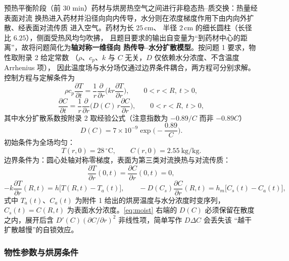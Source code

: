 \documentclass{ctexart}
\begin{document}
预热平衡阶段（前 30 min）药材与烘房热空气之间进行非稳态热--质交换：热量经表面对流
换热进入药材并沿径向向内传导，水分则在浓度梯度作用下由内向外扩散、经表面对流传质
进入空气\cite{yan2026heat,srikiatden2007moisture}。药材为长 $25\,\mathrm{cm}$、
半径 $2\,\mathrm{cm}$ 的细长圆柱（长径比 $6.25$），侧面受热风均匀吹拂，
且题目要求的输出自变量为“到药材中心的距离”，故将问题简化为\textbf{轴对称一维径向
热传导--水分扩散模型}。按问题 1 要求，物性取附录 2 给定常数
（$\rho$、$c_p$、$k$ 与 $C$ 无关，$D$ 仅依赖水分浓度、不含温度 Arrhenius 项），
因此温度场与水分场仅通过边界条件耦合，两方程可分别求解。控制方程与定解条件为
\begin{equation}
  \rho c_p\frac{\partial T}{\partial t}
  =\frac{1}{r}\frac{\partial}{\partial r}\Big(k r\frac{\partial T}{\partial r}\Big),
  \qquad 0<r<R,\ t>0,
  \label{eq:heat}
\end{equation}
\begin{equation}
  \frac{\partial C}{\partial t}
  =\frac{1}{r}\frac{\partial}{\partial r}\Big(D(C)\,r\frac{\partial C}{\partial r}\Big),
  \qquad 0<r<R,\ t>0,
  \label{eq:moist}
\end{equation}
其中水分扩散系数按附录 2 取经验公式（注意指数为 $-0.89/C$ 而非 $-0.89C$）
\begin{equation}
  D(C)=7\times10^{-9}\exp\!\Big(-\frac{0.89}{C}\Big).
  \label{eq:D}
\end{equation}
初始条件为全场均匀：
\begin{equation}
  T(r,0)=28\,^{\circ}\mathrm{C},\qquad C(r,0)=2.55\ \mathrm{kg/kg}.
  \label{eq:ic}
\end{equation}
边界条件为：圆心处轴对称零梯度，表面为第三类对流换热与对流传质：
\begin{equation}
  \frac{\partial T}{\partial r}(0,t)=\frac{\partial C}{\partial r}(0,t)=0,
  \label{eq:bc0}
\end{equation}
\begin{equation}
  -k\frac{\partial T}{\partial r}(R,t)=h\big[T(R,t)-T_a(t)\big],
  \qquad
  -D(C_s)\frac{\partial C}{\partial r}(R,t)=h_m\big[C_s(t)-C_a(t)\big],
  \label{eq:bcR}
\end{equation}
式中 $T_a(t)$、$C_a(t)$ 为附件 1 给出的烘房温度与水分浓度时变序列，$C_s(t)=C(R,t)$
为表面水分浓度。\eqref{eq:moist} 右端的 $D(C)$ 必须保留在散度之内，展开后含
$D'(C)(\partial C/\partial r)^2$ 非线性项，简单写作 $D\Delta C$ 会丢失该
“越干扩散越慢”的自锁效应。

\subsubsection{物性参数与烘房条件}
\end{document}
